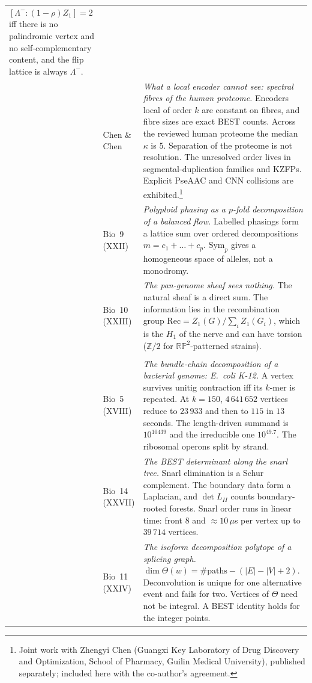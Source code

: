 \documentclass[11pt]{article}
\newcommand{\Lm}{\Lambda^{-}}
\begin{document}
\begin{longtable}{>{\raggedright\arraybackslash}p{}>{\raggedright\arraybackslash}p{}>{\raggedright\arraybackslash}p{}}
$[\Lm:(1-\rho)Z_1]=2$ iff there is no palindromic vertex and no self-complementary content, and the flip
lattice is always $\Lm$.\\
12 & Chen \& Chen & \emph{What a local encoder cannot see: spectral fibres of the human proteome.}
Encoders local of order $k$ are constant on fibres, and fibre sizes are exact BEST counts. Across the
reviewed human proteome the median $\kappa$ is $5$. Separation of the proteome is not resolution. The
unresolved order lives in segmental-duplication families and KZFPs. Explicit PseAAC and CNN collisions
are exhibited.\footnote{Joint work with Zhengyi Chen (Guangxi Key Laboratory of Drug Discovery and
Optimization, School of Pharmacy, Guilin Medical University), published separately; included here with
the co-author's agreement.}\\
13 & Bio~9 (XXII) & \emph{Polyploid phasing as a $p$-fold decomposition of a balanced flow.} Labelled
phasings form a lattice sum over ordered decompositions $m=c_1+\dots+c_p$. $\mathrm{Sym}_p$ gives a
homogeneous space of alleles, not a monodromy.\\
14 & Bio~10 (XXIII) & \emph{The pan-genome sheaf sees nothing.} The natural sheaf is a direct sum. The
information lies in the recombination group $\mathrm{Rec}=Z_1(G)/\sum_iZ_1(G_i)$, which is the $H_1$ of
the nerve and can have torsion ($\mathbb Z/2$ for $\mathbb{RP}^2$-patterned strains).\\[4pt]
\multicolumn{3}{l}{\textbf{Part IV. Algorithmic implementations on genomes}}\\[2pt]
15 & Bio~5 (XVIII) & \emph{The bundle-chain decomposition of a bacterial genome: E.\ coli K-12.} A vertex
survives unitig contraction iff its $k$-mer is repeated. At $k=150$, $4\,641\,652$ vertices reduce to
$23\,933$ and then to $115$ in $13$ seconds. The length-driven summand is $10^{10439}$ and the
irreducible one $10^{49.7}$. The ribosomal operons split by strand.\\
16 & Bio~14 (XXVII) & \emph{The BEST determinant along the snarl tree.} Snarl elimination is a Schur
complement. The boundary data form a Laplacian, and $\det L_{II}$ counts boundary-rooted forests. Snarl
order runs in linear time: front $8$ and $\approx10\,\mu$s per vertex up to $39\,714$ vertices.\\
17 & Bio~11 (XXIV) & \emph{The isoform decomposition polytope of a splicing graph.}
$\dim\Theta(w)=\#\text{paths}-(|E|-|V|+2)$. Deconvolution is unique for one alternative event and fails
for two. Vertices of $\Theta$ need not be integral. A BEST identity holds for the integer points.\\
\bottomrule
\end{longtable}
\end{document}
